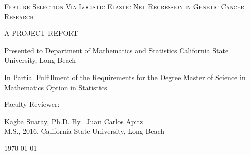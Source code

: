 \documentclass[12pt,a4paper]{article}
\begin{document}
\begin{titlepage}
	\centering
	{\scshape\Large Feature Selection Via Logistic Elastic Net Regression in Genetic Cancer Research \par}
	\vspace{1cm}
	{\scshape\large A PROJECT REPORT\par}
	{\large Presented to Department of Mathematics and Statistics California State University, Long Beach\par}
	\vspace{4cm}
	{\large In Partial Fulfillment of the Requirements for the Degree Master of Science in Mathematics Option in Statistics\par}
	\vspace{3cm}
	{\large Faculty Reviewer:\par}
	\vspace{0.5cm}
	{\large Kagba Suaray, Ph.D.}
	\vfill
	\large By ~Juan Carlos Apitz\\
	\large M.S., 2016, California State University, Long Beach\par

	\vfill

	{\large \today\par}

\end{titlepage}

\tableofcontents

\pagebreak

\begin{abstract}
The purpose of this analysis is to present and implement an effective methodology for dealing with datasets where the number of samples $n$ is much smaller than the number of covariates $p$. This methodology is called regularized logistic regression via the Elastic Net. Having $p>>n$ is a problem common with microarray expression data where typically the dataset contains tens to maybe less than a few hundred samples vs. thousands of genes. A typical problem in this context is that of classification. The response variable in the dataset is typically binary, encoding the presence of a particular cancer class. In our case study we analyze breast cancer expression data containing luminal vs. non-luminal breast cancer types. By implementing the proposed methodology we are able to reduce the number of genes from 47,293 to 1,182 genes. We use the fitted model to perform classification and obtain accuracy of 86\%.
\end{abstract}
\end{document}
